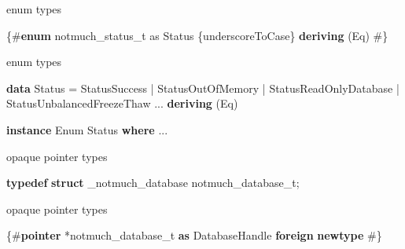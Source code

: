 \documentclass[ignorenonframetext,aspectratio=169]{beamer}
\newenvironment{Shaded}{}{}
\newcommand{\KeywordTok}[1]{\textcolor[rgb]{0.00,0.44,0.13}{\textbf{{#1}}}}
\newcommand{\DataTypeTok}[1]{\textcolor[rgb]{0.56,0.13,0.00}{{#1}}}
\newcommand{\StringTok}[1]{\textcolor[rgb]{0.25,0.44,0.63}{{#1}}}
\newcommand{\FunctionTok}[1]{\textcolor[rgb]{0.02,0.16,0.49}{{#1}}}
\newcommand{\NormalTok}[1]{{#1}}
\begin{document}
\begin{frame}[fragile]{enum types}

\begin{Shaded}
\begin{Highlighting}[]
\StringTok{\{#}\KeywordTok{enum} \StringTok{notmuch_status_t} as \DataTypeTok{Status} \StringTok{\{underscoreToCase\} \KeywordTok{deriving} (}\DataTypeTok{Eq}\StringTok{) #\}}
\end{Highlighting}
\end{Shaded}

\end{frame}

\begin{frame}[fragile]{enum types}

\begin{Shaded}
\begin{Highlighting}[]
\KeywordTok{data} \DataTypeTok{Status} \FunctionTok{=} \DataTypeTok{StatusSuccess}
            \FunctionTok{|} \DataTypeTok{StatusOutOfMemory}
            \FunctionTok{|} \DataTypeTok{StatusReadOnlyDatabase}
            \FunctionTok{|} \DataTypeTok{StatusUnbalancedFreezeThaw}
            \FunctionTok{...}
  \KeywordTok{deriving} \NormalTok{(}\DataTypeTok{Eq}\NormalTok{)}

\KeywordTok{instance} \DataTypeTok{Enum} \DataTypeTok{Status} \KeywordTok{where}
  \FunctionTok{...}
\end{Highlighting}
\end{Shaded}

\end{frame}

\begin{frame}[fragile]{opaque pointer types}

\begin{Shaded}
\begin{Highlighting}[]
\KeywordTok{typedef} \KeywordTok{struct} \NormalTok{_notmuch_database notmuch_database_t;}
\end{Highlighting}
\end{Shaded}

\end{frame}

\begin{frame}[fragile]{opaque pointer types}

\begin{Shaded}
\begin{Highlighting}[]
\StringTok{\{#}\KeywordTok{pointer}\StringTok{ *notmuch_database_t }\KeywordTok{as}\StringTok{ }\DataTypeTok{DatabaseHandle}\StringTok{ }\KeywordTok{foreign}\StringTok{ }\KeywordTok{newtype}\StringTok{ #\}}
\end{Highlighting}
\end{Shaded}

\end{frame}
\end{document}
